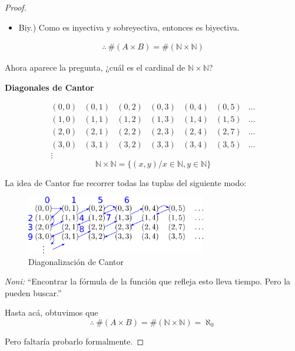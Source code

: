\begin{enumerate}
\begin{proof}
\begin{itemize}
        \item Biy.) Como es inyectiva y sobreyectiva, entonces es biyectiva.
    \end{itemize}
    \begin{gather*}
        \therefore ~  \#(A\times B)=\#( \mathbb{N} \times \mathbb{N})
    \end{gather*}

    Ahora aparece la pregunta, ¿cuál es el cardinal de 
    $\mathbb{N}\times\mathbb{N}$?

\textbf{Diagonales de Cantor}

    \begin{equation*}
        \begin{matrix*}
            (0,0) & (0,1) & (0,2) & (0,3) & (0,4) & (0,5) & \dots \\
            (1,0) & (1,1) & (1,2) & (1,3) & (1,4) & (1,5) & \dots \\
            (2,0) & (2,1) & (2,2) & (2,3) & (2,4) & (2,7) & \dots \\
            (3,0) & (3,1) & (3,2) & (3,3) & (3,4) & (3,5) & \dots \\
            \vdots
        \end{matrix*}
    \end{equation*}
    \[ \mathbb{N}\times\mathbb{N} 
    = \{(x,y) / x \in \mathbb{N}, y \in \mathbb{N}\} \]

    La idea de Cantor fue recorrer todas las tuplas del siguiente modo:
    \begin{figure}[H]
        \centering
        \includegraphics[width=0.70\textwidth]{mapeo_n2yn}
        \caption{Diagonalización de Cantor}
    \end{figure}

    \textit{Noni:} ``Encontrar la fórmula de la función que refleja esto lleva 
    tiempo. Pero la pueden buscar.''

    Hasta acá, obtuvimos que 
    \[ \therefore ~  \#(A\times B)=\#( \mathbb{N} \times \mathbb{N}) =
    \aleph_0 \]

    Pero faltaría probarlo formalmente. 

\end{proof}

\end{enumerate}

